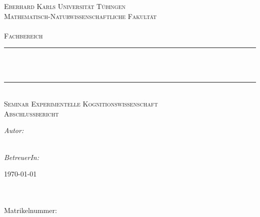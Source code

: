 \begin{titlepage}

\begin{center}
  

\textsc{\LARGE  Eberhard Karls Universität Tübingen\\Mathematisch-Naturwissenschaftliche Fakultät\\ \institut\\
Fachbereich \fachbereich}\\[4cm]


\newcommand{\HRule}{\rule{\linewidth}{0.5mm}}
\HRule \\[0.4cm]
\vspace{0.4cm}
{ \huge \bfseries \titel}\\[0.4cm]

\HRule \\[1cm]

\textsc{\Large Seminar Experimentelle Kognitionswissenschaft\\ Abschlussbericht}\\[0.5cm]

\vspace{4cm}
\begin{minipage}{0.4\textwidth}
\begin{flushleft} \large
\emph{Autor:}\\
\vorname \space\textsc{\name}\\
\end{flushleft}
\end{minipage}
\hfill
\begin{minipage}{0.4\textwidth}
\begin{flushright} \large
\emph{BetreuerIn:} \\
\betreuerIn
\end{flushright}
\end{minipage}

\vfill

{\large \today}

\end{center}

\end{titlepage}

\begin{titlepage}
	\noindent
	\textbf{\titel}\\
	\vorname \space\name\\
	Matrikelnummer: \matrikelnr
\end{titlepage}

